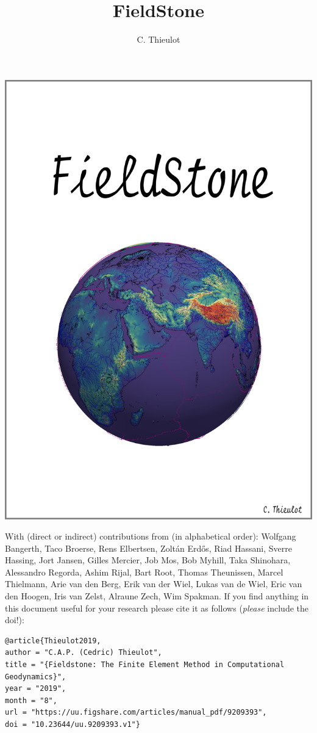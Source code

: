\documentclass[a4paper]{article}
\title{FieldStone}
\author{C. Thieulot}
\numberwithin{equation}{section}
\begin{document}
\thispagestyle{empty}
\includegraphics[width=0.9\linewidth]{images/frontpage/frontpage.png}

{\scriptsize With (direct or indirect) contributions from (in alphabetical order): 
Wolfgang Bangerth, 
Taco Broerse,
Rens Elbertsen,
Zolt{\'a}n Erd{\H{o}}s, 
Riad Hassani,
Sverre Hassing,
Jort Jansen,
Gilles Mercier,
Job Mos, 
Bob Myhill,
Taka Shinohara, 
Alessandro Regorda,
Ashim Rijal,
Bart Root,
Thomas Theunissen,
Marcel Thielmann,
Arie van den Berg,
Erik van der Wiel, 
Lukas van de Wiel, 
Eric van den Hoogen, 
Iris van Zelst,
Alraune Zech, 
Wim Spakman.}
\newpage
If you find anything in this document useful for your research please cite it 
as follows ({\it please} include the doi!):

\begin{verbatim}
@article{Thieulot2019,
author = "C.A.P. (Cedric) Thieulot",
title = "{Fieldstone: The Finite Element Method in Computational Geodynamics}",
year = "2019",
month = "8",
url = "https://uu.figshare.com/articles/manual_pdf/9209393",
doi = "10.23644/uu.9209393.v1"}
\end{verbatim}
\end{document}
